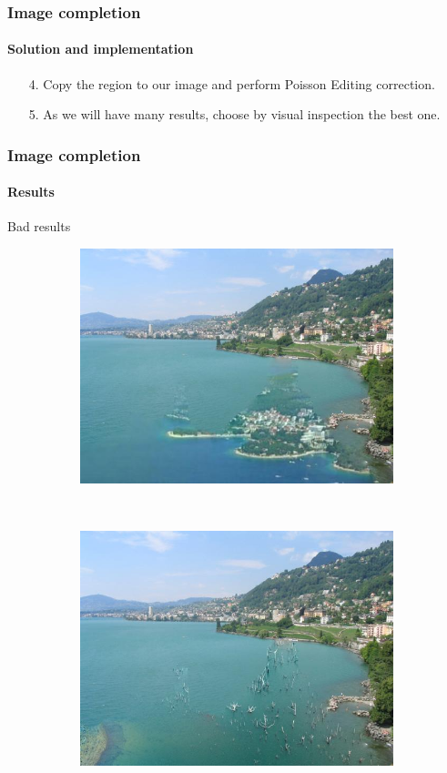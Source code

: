 \documentclass[11pt]{beamer}
\begin{document}
\begin{frame}
\frametitle{Image completion}
\framesubtitle{Solution and implementation}
\begin{itemize}
\item [4.] Copy the region to our image and perform Poisson Editing correction.
\item [5.] As we will have many results, choose by visual inspection the best one.
\end{itemize}
\end{frame}

\begin{frame}
\frametitle{Image completion}
\framesubtitle{Results}
Bad results


\begin{figure}
    \centering
    \begin{subfigure}[b]{0.36\textwidth}
        \includegraphics[width=\textwidth]{IMG_0681_bilderwelten012}

    \end{subfigure}
    ~ 
        \begin{subfigure}[b]{0.36\textwidth}
        \includegraphics[width=\textwidth]{IMG_0681_DUC0015}


\end{subfigure}
\end{figure}
\end{frame}
\end{document}
